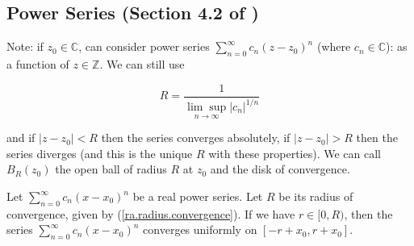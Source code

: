 \subsection{Power Series (Section 4.2 of \citet{pugh2015real})}

Note: if \(z_0 \in \mathbb{C}\), can consider power series \(\sum_{n=0}^\infty c_n(z - z_0)^n\) (where \(c_n \in \mathbb{C}\)): as a function of \(z \in \mathbb{Z}\). We can still use

\begin{equation}\label{ra.radius.convergence}
R = \frac{1}{ \underset{n\to\infty}{\lim \sup} |c_n|^{1/n}}
\end{equation}

and if \(|z - z_0| < R\) then the series converges absolutely, if \(|z - z_0| > R\) then the series diverges (and this is the unique \(R\) with these properties). We can call \(B_R(z_0)\) the open ball of radius \(R\) at \(z_0\) and the disk of convergence. 

\begin{theorem}

Let \(\sum_{n=0}^\infty c_n (x - x_0)^n\) be a real power series. Let \(R\) be its radius of convergence, given by (\ref{ra.radius.convergence}). If we have \(r \in [0, R)\), then the series \(\sum_{n=0}^\infty c_n (x - x_0)^n\) converges uniformly on \([-r + x_0, r+ x_0]\).

\end{theorem}

